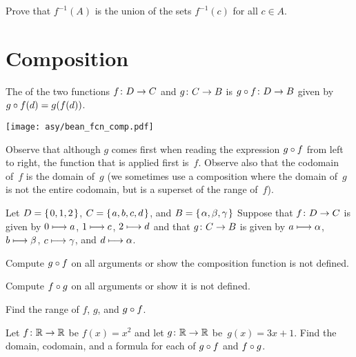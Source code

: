 \documentclass{ibl}
\begin{document}
\begin{ex}
Prove that $f^{-1}(A)$ is the union of the sets $f^{-1}(c)$ for all $c\in A$.
\end{ex}





\section{Composition}

\begin{df}
The  of
the two functions
$\mbox{$f\colon D\to C$}$ and $\mbox{$g\colon C\to B$}$ 
is $\mbox{$g\mathbin{\circ} f\colon D\to B$}$ given by 
$g\mathbin{\circ} f(d)=g(f(d))$.
\end{df}

\begin{center}
  \texttt{[image: asy/bean\_fcn\_comp.pdf]}  
\end{center}
Observe that although $g$ comes first when reading the expression 
$g\mathbin{\circ} f$ 
from left to right, 
the function that is applied first is~$f$. 
Observe also that the codomain of~$f$ is the domain of~$g$
(we sometimes use a composition where the domain of~$g$ is not the 
entire codomain, but is a superset of the range of~$f$).

\begin{ex} Let $D=\mbox{$\{\hspace{0.1em}0,1,2\hspace{0.1em}\}$}$, $C=\mbox{$\{\hspace{0.1em}a,b,c,d\hspace{0.1em}\}$}$, 
and $B=\mbox{$\{\hspace{0.1em}\alpha,\beta,\gamma\hspace{0.1em}\}$}$
Suppose that $\mbox{$f\colon D\to C$}$ is given by $0\stackrel{}{\longmapsto} a$, $1\stackrel{}{\longmapsto} c$, 
$2\stackrel{}{\longmapsto} d$ and that $\mbox{$g\colon C\to B$}$
is given by 
$a\stackrel{}{\longmapsto}\alpha$, $b\stackrel{}{\longmapsto} \beta$, $c\stackrel{}{\longmapsto}\gamma$,
and $d\stackrel{}{\longmapsto}\alpha$.
\begin{exes}
\item Compute $g\mathbin{\circ} f$ on all arguments or show the composition
  function is not defined.
\item Compute $f\mathbin{\circ} g$ on all arguments or show it is not defined.
\item Find the range of $f$, $g$, and $g\mathbin{\circ} f$.    
\end{exes}
\end{ex}

\begin{ex}
Let $\mbox{$f\colon \mathbb{R}\to \mathbb{R}$}$ be $f(x)=x^2$ and let $\mbox{$g\colon \mathbb{R}\to \mathbb{R}$}$ be~$g(x)=3x+1$.
Find the domain, codomain, and a formula for each of
$g\mathbin{\circ} f$ and $f\mathbin{\circ} g$.  
\end{ex}
\end{document}
